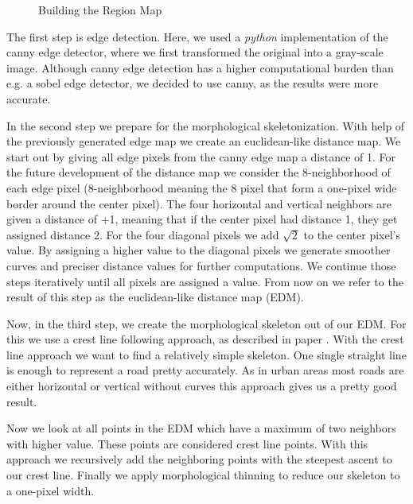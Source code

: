 \documentclass[10pt,conference,compsocconf]{IEEEtran}
\begin{document}
\begin{figure}[tp]
	\hspace{0.025\linewidth}
	\addtocounter{subfigure}{+1}
	\caption{Building the Region Map}
	\label{fig:skeleton_map}
\end{figure}

The first step is edge detection. Here, we used a \emph{python} implementation of the canny edge detector, where we first transformed the original into a gray-scale image. Although canny edge detection has a higher computational burden than e.g. a sobel edge detector, we decided to use canny, as the results were more accurate.

In the second step we prepare for the morphological skeletonization. With help of the previously generated edge map we create an euclidean-like distance map. We start out by giving all edge pixels from the canny edge map a distance of 1. For the future development of the distance map we consider the 8-neighborhood of each edge pixel (8-neighborhood meaning the 8 pixel that form a one-pixel wide border around the center pixel). The four horizontal and vertical neighbors are given a distance of +1, meaning that if the center pixel had distance 1, they get assigned distance 2. For the four diagonal pixels we add $\sqrt{2}$ to the center pixel's value. By assigning a higher value to the diagonal pixels we generate smoother curves and preciser distance values for further computations. We continue those steps iteratively until all pixels are assigned a value. From now on we refer to the result of this step as the euclidean-like distance map (EDM).

Now, in the third step, we create the morphological skeleton out of our EDM. For this we use a crest line following approach, as described in paper \cite{GaZeScPo11}. With the crest line approach we want to find a relatively simple skeleton. One single straight line is enough to represent a road pretty accurately. As in urban areas most roads are either horizontal or vertical without curves this approach gives us a pretty good result. 

Now we look at all points in the EDM which have a maximum of two neighbors with higher value. These points are considered crest line points. With this approach we recursively add the neighboring points with the steepest ascent to our crest line. Finally we apply morphological thinning to reduce our skeleton to a one-pixel width.
\end{document}
